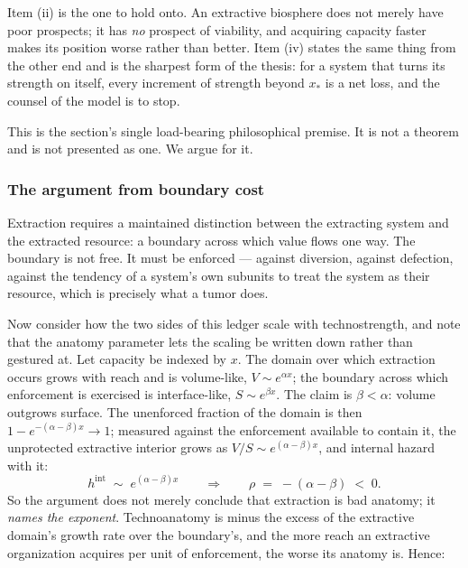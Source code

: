 \documentclass[11pt]{article}
\numberwithin{equation}{section}
\theoremstyle{plain}
\theoremstyle{definition}
\theoremstyle{remark}
\begin{document}
\noindent Item (ii) is the one to hold onto. An extractive biosphere
does not merely have poor prospects; it has \emph{no} prospect of
viability, and acquiring capacity faster makes its position worse rather
than better. Item (iv) states the same thing from the other end and is
the sharpest form of the thesis: for a system that turns its strength on
itself, every increment of strength beyond $x_\ast$ is a net loss, and
the counsel of the model is to stop.

This is the section's single load-bearing philosophical premise. It is
not a theorem and is not presented as one. We argue for it.

\subsubsection{The argument from boundary cost}\label{gr:subsub:boundary}

Extraction requires a maintained distinction between the extracting
system and the extracted resource: a boundary across which value flows
one way. The boundary is not free. It must be enforced --- against
diversion, against defection, against the tendency of a system's own
subunits to treat the system as their resource, which is precisely what
a tumor does.

Now consider how the two sides of this ledger scale with technostrength,
and note that the anatomy parameter lets the scaling be written down
rather than gestured at. Let capacity be indexed by $x$. The domain over
which extraction occurs grows with reach and is volume-like,
$V\sim e^{\alpha x}$; the boundary across which enforcement is exercised
is interface-like, $S\sim e^{\beta x}$. The claim is
$\beta<\alpha$: volume outgrows surface. The unenforced fraction of the
domain is then $1-e^{-(\alpha-\beta)x}\to1$; measured against the
enforcement available to contain it, the unprotected extractive
interior grows as $V/S\sim e^{(\alpha-\beta)x}$, and internal hazard
with it:
\begin{equation}\label{gr:eq:rhoextract}
h^{\mathrm{int}}\;\sim\;e^{(\alpha-\beta)x}
\qquad\Longrightarrow\qquad
\rho\;=\;-(\alpha-\beta)\;<\;0 .
\end{equation}
So the argument does not merely conclude that extraction is bad
anatomy; it \emph{names the exponent}. Technoanatomy is minus the excess
of the extractive domain's growth rate over the boundary's, and the more
reach an extractive organization acquires per unit of enforcement, the
worse its anatomy is. Hence:
\end{document}
